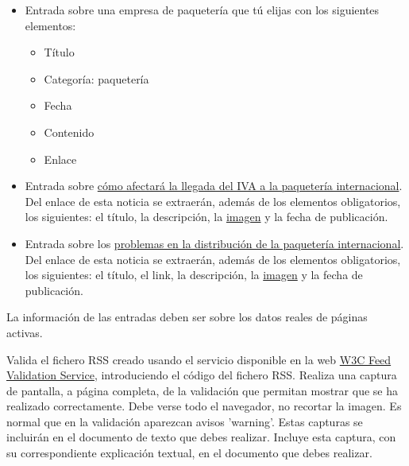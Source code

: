 \begin{itemize}
    \item Entrada sobre una empresa de paquetería que tú elijas con los siguientes elementos:
    \begin{itemize}
        \item Título
        \item Categoría: paquetería
        \item Fecha
        \item Contenido
        \item Enlace
    \end{itemize}

    \item Entrada sobre \href{https://logistica.cdecomunicacion.es/noticias/sectoriales/45956/aliexpress-llegada-iva-paqueteria-internacional}{cómo afectará la llegada del IVA a la paquetería internacional}. Del enlace de esta noticia se extraerán,  además de los elementos obligatorios, los siguientes: el título, la descripción, la \href{https://logistica.cdecomunicacion.es/wp-content/webp-express/webp-images/uploads/2022/12/1624960313-paquetera-iva-aduanas-1-1140x594.jpg.webp}{imagen} y la fecha de publicación.

    \item Entrada sobre los \href{https://logistica.cdecomunicacion.es/wp-content/webp-express/webp-images/uploads/2022/12/1624960313-paquetera-iva-aduanas-1-1140x594.jpg.webp}{problemas en la distribución de la paquetería internacional}. Del enlace de esta noticia se extraerán, además de los elementos obligatorios, los siguientes: el título, el link, la descripción, la \href{https://cdn0.celebritax.com/sites/default/files/styles/watermark_100/public/1642440970-denuncian-atraso-siete-meses-distribucion-paqueteria-internacional-cuba.jpg}{imagen} y la fecha de publicación.
\end{itemize}

La información de las entradas deben ser sobre los datos reales de páginas activas.

Valida el fichero RSS creado usando el servicio disponible en la web \href{https://validator.w3.org/feed/#validate_by_input}{W3C Feed Validation Service}, introduciendo el código del fichero RSS. Realiza una captura de pantalla, a página completa, de la validación que permitan mostrar que se ha realizado correctamente. Debe verse todo el navegador, no recortar la imagen. Es normal que en la validación aparezcan avisos 'warning'. Estas capturas se incluirán en el documento de texto que debes realizar. Incluye esta captura, con su correspondiente explicación textual, en el documento que debes realizar.

